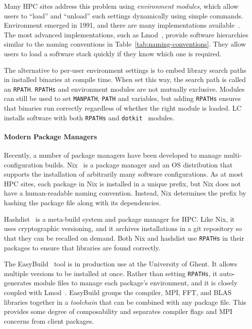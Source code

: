 Many HPC sites address this problem using {\it environment modules}, which 
allow users to ``load'' and ``unload'' such settings dynamically using simple 
commands. Environment emerged in 1991, and there are many implementations 
available~\cite{dotkit,furlani+:lisa91,furlani+:lisa96,mclay:lmod,mclay:lmod-tutorial}.
The most advanced implementations, such as Lmod~\cite{mclay:lmod,mclay:lmod-tutorial},
provide software hierarchies similar to the naming conventions in 
Table~\ref{tab:naming-conventions}. They allow users to load a software stack
quickly if they know which one is required.

The alternative to per-user environment settings is to embed library search 
paths in installed binaries at compile time. When set this way, the search 
path is called an {\tt RPATH}. {\tt RPATHs} and environment modules are not 
mutually exclusive. Modules can still be used to set {\tt MANPATH}, {\tt PATH}
and variables, but adding {\tt RPATHs} ensures that binaries run correctly 
regardless of whether the right module is loaded. LC installs software with 
both {\tt RPATHs} and {\tt dotkit}~\cite{dotkit} modules.

\paragraph{Modern Package Managers}

Recently, a number of package managers have been developed to manage 
multi-configuration builds.
%
Nix~\cite{dolstra+:icfp08,dolstra+:lisa04}
is a package manager and an OS distribution that supports the installation of
arbitrarily many software configurations.  As at most HPC sites, each package
in Nix is installed in a unique prefix, but Nix does not have a human-readable
naming convention.  Instead, Nix determines the prefix by hashing the package
file along with its dependencies.

Hashdist~\cite{hashdist} is a meta-build system and package manager for HPC.
Like Nix, it uses cryptographic versioning, and it archives installations
in a git repository so that they can be recalled on demand. 
%
Both Nix and hashdist use {\tt RPATHs} in their packages to ensure that
libraries are found correctly. 

The EasyBuild~\cite{hoste+:pyhpc12} tool is in production use at
the University of Ghent.  It allows multiple versions to be installed
at once.  Rather than setting {\tt RPATHs}, it auto-generates module files
to manage each package's environment, and it is closely coupled with 
Lmod~\cite{geimer+:hust14}.  EasyBuild groups the compiler, MPI, FFT, and
BLAS libraries together in a {\it toolchain} that can be combined with
any package file. This provides some degree of composability and
separates compiler flags and MPI concerns from client packages.

